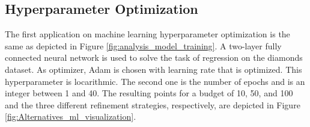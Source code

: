 \subsection{Hyperparameter Optimization}

The first application on machine learning hyperparameter optimization is the same as depicted in Figure \ref{fig:analysis_model_training}. A two-layer fully connected neural network is used to solve the task of regression on the diamonds dataset. As optimizer, Adam is chosen with learning rate that is optimized. This hyperparameter is locarithmic. The second one is the number of epochs and is an integer between 1 and 40. The resulting points for a budget of 10, 50, and 100 and the three different refinement strategies, respectively, are depicted in Figure \ref{fig:Alternatives_ml_visualization}.



